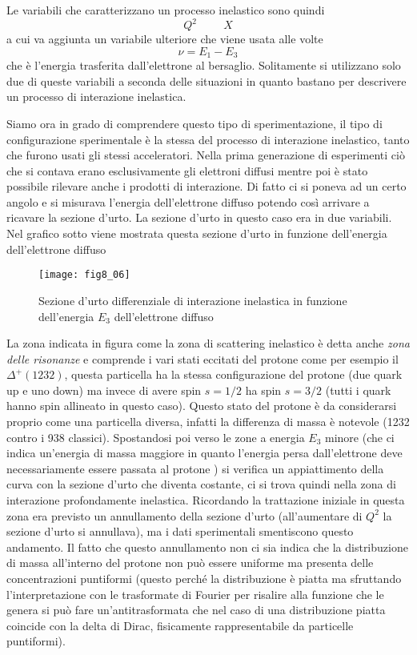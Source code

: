 Le variabili che caratterizzano un processo inelastico sono quindi
\begin{equation}
Q^2\hspace{1cm} X
\end{equation}
a cui va aggiunta un variabile ulteriore che viene usata alle volte
\begin{equation}
\nu=E_1-E_3
\end{equation}
che è l'energia trasferita dall'elettrone al bersaglio.
Solitamente si utilizzano solo due di queste variabili a seconda delle situazioni in quanto bastano per descrivere un processo di interazione inelastica.

Siamo ora in grado di comprendere questo tipo di sperimentazione, il tipo di configurazione sperimentale è la stessa del processo di interazione inelastico, tanto che furono usati gli stessi acceleratori.
Nella prima generazione di esperimenti ciò che si contava erano esclusivamente gli elettroni diffusi mentre poi è stato possibile rilevare anche i prodotti di interazione.
Di fatto ci si poneva ad un certo angolo e si misurava l'energia dell'elettrone diffuso potendo così arrivare a ricavare la sezione d'urto.
La sezione d'urto in questo caso era in due variabili.
Nel grafico sotto viene mostrata questa sezione d'urto in funzione dell'energia dell'elettrone diffuso
\begin{figure}[h]
\centering
\texttt{[image: fig8\_06]}
\caption{Sezione d'urto differenziale di interazione inelastica in funzione dell'energia $E_3$ dell'elettrone diffuso}
\end{figure}

La zona indicata in figura come la zona di scattering inelastico è detta anche \emph{zona delle risonanze} e comprende i vari stati eccitati del protone come per esempio il $\Delta^+(1232)$, questa particella ha la stessa configurazione del protone (due quark up e uno down) ma invece di avere spin $s=1/2$ ha spin $s=3/2$ (tutti i quark hanno spin allineato in questo caso).
Questo stato del protone è da considerarsi proprio come una particella diversa, infatti la differenza di massa è notevole (1232 contro i 938 classici).
Spostandosi poi verso le zone a energia $E_3$ minore (che ci indica un'energia di massa maggiore in quanto l'energia persa dall'elettrone deve necessariamente essere passata al protone ) si verifica un appiattimento della curva con la sezione d'urto che diventa costante, ci si trova quindi nella zona di interazione profondamente inelastica.
Ricordando la trattazione iniziale in questa zona era previsto un annullamento della sezione d'urto (all'aumentare di $Q^2$ la sezione d'urto si annullava), ma i dati sperimentali smentiscono questo andamento.
Il fatto che questo annullamento non ci sia indica che la distribuzione di massa all'interno del protone non può essere uniforme ma presenta delle concentrazioni puntiformi (questo perché la distribuzione è piatta ma sfruttando l'interpretazione con le trasformate di Fourier per risalire alla funzione che le genera si può fare un'antitrasformata che nel caso di una distribuzione piatta coincide con la delta di Dirac, fisicamente rappresentabile da particelle puntiformi).
 
